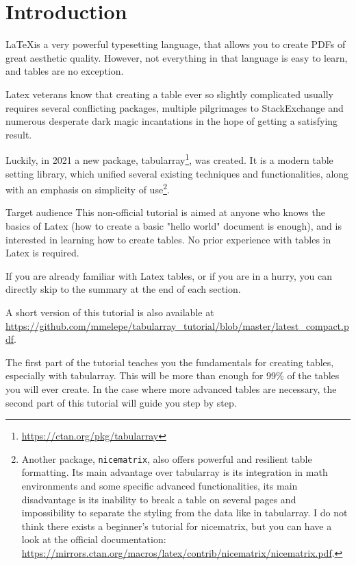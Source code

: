 \documentclass[oneside]{book}
\newcommand{\ShortVersion}{\url{https://github.com/mmelepe/tabularray_tutorial/blob/master/latest_compact.pdf}}
\begin{document}
	


\chapter*{Introduction}
\LaTeX is a very powerful typesetting language, that allows you to create PDFs of great aesthetic quality. However, not everything in that language is easy to learn, and tables are no exception. 

Latex veterans know that creating a table ever so slightly complicated usually requires several conflicting packages, multiple pilgrimages to StackExchange and numerous desperate dark magic incantations in the hope of getting a satisfying result.

Luckily, in 2021 a new package, tabularray\footnote{\url{https://ctan.org/pkg/tabularray}}, was created. It is a modern table setting library, which unified several existing techniques and functionalities, along with an emphasis on simplicity of use\footnote{Another package, \texttt{nicematrix}, also offers powerful and resilient table formatting. Its main advantage over tabularray is its integration in math environments and some specific advanced functionalities, its main disadvantage is its inability to break a table on several pages and impossibility to separate the styling from the data like in tabularray. I do not think there exists a beginner's tutorial for nicematrix, but you can have a look at the official documentation: \url{https://mirrors.ctan.org/macros/latex/contrib/nicematrix/nicematrix.pdf}.}.

\begin{infobox}{Target audience}
This non-official tutorial is aimed at anyone who knows the basics of Latex (how to create a basic "hello world" document is enough), and is interested in learning how to create tables. No prior experience with tables in Latex is required.

If you are already familiar with Latex tables, or if you are in a hurry, you can directly skip to the summary at the end of each section.

A short version of this tutorial is also available at \ShortVersion.
\end{infobox}

The first part of the tutorial teaches you the fundamentals for creating tables, especially with tabularray. This will be more than enough for 99\% of the tables you will ever create. In the case where more advanced tables are necessary, the second part of this tutorial will guide you step by step.
\end{document}
